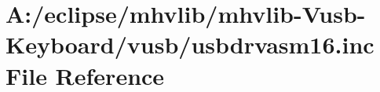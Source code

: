 \hypertarget{mhvlib-_vusb-_keyboard_2vusb_2usbdrvasm16_8inc}{\section{A\-:/eclipse/mhvlib/mhvlib-\/\-Vusb-\/\-Keyboard/vusb/usbdrvasm16.inc File Reference}
\label{mhvlib-_vusb-_keyboard_2vusb_2usbdrvasm16_8inc}
}
